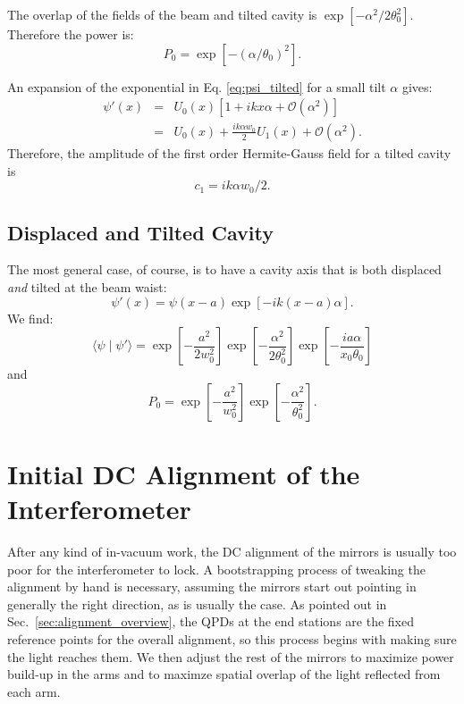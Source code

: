 The overlap of the fields of the beam and tilted cavity is $ \exp{[-\alpha^2/2 \theta_0^2]} $. Therefore the power is:
\begin{equation}
P_0 = \exp{[-(\alpha/\theta_0)^2]}.
\end{equation}

An expansion of the exponential in Eq. \ref{eq:psi_tilted} for a small
tilt $\alpha$ gives:
\begin{eqnarray}
\psi \prime(x) &=& U_0(x) [1 + i k x \alpha + \mathcal{O}(\alpha^2) ] \\
&=& U_0(x) + \frac{i k \alpha w_0}{2} U_1(x) + \mathcal{O}(\alpha^2).
\end{eqnarray}
Therefore, the amplitude of the first order Hermite-Gauss field for a
tilted cavity is 
\begin{equation}
c_1 = i k \alpha w_0 / 2.
\end{equation}


\subsection{Displaced and Tilted Cavity}
The most general case, of course, is to have a cavity axis that is both displaced \emph{and} tilted at the beam waist:
\begin{equation}
\psi \prime(x) = \psi(x-a) \exp{[-i k (x-a) \alpha]}.
\end{equation}
We find:
\begin{equation}
\langle \psi \mid \psi \prime \rangle = \exp{\left[- \frac{a^2}{2 w_0^2} \right]} \exp{\left[-\frac{\alpha^2}{2 \theta_0^2}\right]} \exp{\left[- \frac{i a \alpha}{x_0 \theta_0}\right]}
\end{equation}
and
\begin{equation}
P_0 = \exp{\left[- \frac{a^2}{w_0^2} \right]}
\exp{\left[-\frac{\alpha^2}{\theta_0^2}\right]}.
\label{eq:pwr_disptilt}
\end{equation}



\section{Initial DC Alignment of the Interferometer}
\label{sec:initial_alignment}
After any kind of in-vacuum work, the DC alignment of the mirrors is
usually too poor for the interferometer to lock. A bootstrapping
process of tweaking the alignment by hand is necessary, assuming the
mirrors start out pointing in generally the right direction, as is
usually the case. As pointed out in Sec.~\ref{sec:alignment_overview}, the
QPDs at the end stations are the fixed reference points for the
overall alignment, so this process begins with making sure the light
reaches them. We then adjust the rest of the mirrors to maximize power
build-up in the arms and to maximze spatial overlap of the light
reflected from each arm.

